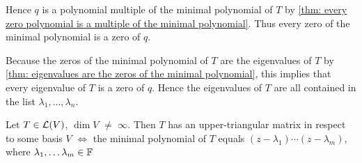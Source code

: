 \begin{prf}
  Hence $q$ is a polynomial multiple of the minimal polynomial of $T$ by \ref{thm: every zero polynomial is a multiple of the minimal polynomial}. Thus every zero of the minimal polynomial is a zero of $q$.

  Because the zeros of the minimal polynomial of $T$ are the eigenvalues of $T$ by \ref{thm: eigenvalues are the zeros of the minimal polynomial}, this implies that every eigenvalue of $T$ is a zero of $q$. Hence the eigenvalues of $T$ are all contained in the list $\lambda_1, \ldots, \lambda_n$.
\end{prf}


\setcounter{thm}{43}
\begin{thm}
  \label{thm: necessary and sufficient condition to have an upper-triangular-matrix}
  Let $T\in \mathcal{L}(V)$, $\dim V$ $\neq$ $\infty$. Then $T$ has an upper-triangular matrix in respect to some basis $V$ $\iff$ the minimal polynomial of $T$ equals $(z-\lambda_1) \cdots (z-\lambda_m)$, where $\lambda_1, \dots \lambda_m \in \mathbb{F}$
\end{thm}
